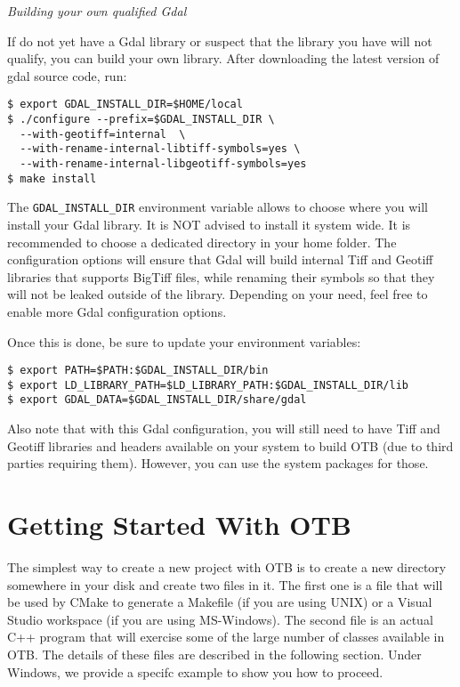 \emph{Building your own qualified Gdal}

If do not yet have a Gdal library or suspect that the library you have will not qualify, you can build your own library. After downloading the latest version of gdal source code, run:

\begin{verbatim}
$ export GDAL_INSTALL_DIR=$HOME/local
$ ./configure --prefix=$GDAL_INSTALL_DIR \
  --with-geotiff=internal  \
  --with-rename-internal-libtiff-symbols=yes \
  --with-rename-internal-libgeotiff-symbols=yes
$ make install
\end{verbatim}

The \texttt{GDAL\_INSTALL\_DIR} environment variable allows to choose where you will install your Gdal library. It is NOT advised to install it system wide. It is recommended to choose a dedicated directory in your home folder. The configuration options will ensure that Gdal will build internal Tiff and Geotiff libraries that supports BigTiff files, while renaming their symbols so that they will not be leaked outside of the library. Depending on your need, feel free to enable more Gdal configuration options.

Once this is done, be sure to update your environment variables:
\begin{verbatim}
$ export PATH=$PATH:$GDAL_INSTALL_DIR/bin
$ export LD_LIBRARY_PATH=$LD_LIBRARY_PATH:$GDAL_INSTALL_DIR/lib
$ export GDAL_DATA=$GDAL_INSTALL_DIR/share/gdal
\end{verbatim}

Also note that with this Gdal configuration, you will still need to have Tiff and Geotiff libraries and headers available on your system to build OTB (due to third parties requiring them). However, you can use the system packages for those.



\section{Getting Started With OTB }
\label{sec:GettingStartedWithOTB}

The simplest way to create a new project with OTB is to create a new directory somewhere in your disk and create two files in it. The first one is a  file that will be used by CMake to generate a Makefile (if you are using UNIX) or a Visual Studio workspace (if you are using MS-Windows).  The second file is an actual C++ program that will exercise some of the large number of classes available in OTB. The details of these files are described in the following section. Under Windows, we provide a specifc example to show you how to proceed.  

